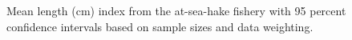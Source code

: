 \documentclass[
]{scrartcl}
\begin{document}
\begin{figure}[H]


\caption{\label{fig-meanlt-ashop}Mean length (cm) index from the
at-sea-hake fishery with 95 percent confidence intervals based on sample
sizes and data weighting.}

\end{figure}%
\end{document}
